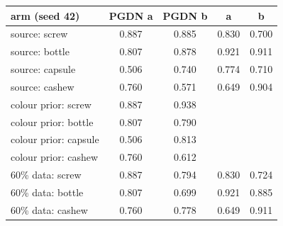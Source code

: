 \setlength{\tabcolsep}{3pt}
\begin{tabular}{@{}lcccc@{}}
\toprule
arm (seed 42) & PGDN a & PGDN b & \draem{} a & \draem{} b \\
\midrule
source: screw & 0.887 & 0.885 & 0.830 & 0.700 \\
source: bottle & 0.807 & 0.878 & 0.921 & 0.911 \\
source: capsule & 0.506 & 0.740 & 0.774 & 0.710 \\
source: cashew & 0.760 & 0.571 & 0.649 & 0.904 \\
colour prior: screw & 0.887 & 0.938 &  &  \\
colour prior: bottle & 0.807 & 0.790 &  &  \\
colour prior: capsule & 0.506 & 0.813 &  &  \\
colour prior: cashew & 0.760 & 0.612 &  &  \\
60\% data: screw & 0.887 & 0.794 & 0.830 & 0.724 \\
60\% data: bottle & 0.807 & 0.699 & 0.921 & 0.885 \\
60\% data: cashew & 0.760 & 0.778 & 0.649 & 0.911 \\
\bottomrule
\end{tabular}

